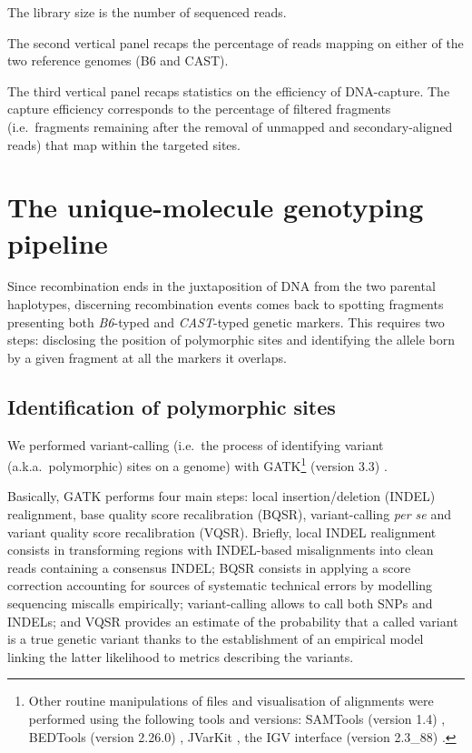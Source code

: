 \begin{sidewaystable}[p]
{		The library size is the number of sequenced reads.
		\par The second vertical panel recaps the percentage of reads mapping on either of the two reference genomes (B6 and CAST).
		\par The third vertical panel recaps statistics on the efficiency of DNA-capture.
		The capture efficiency corresponds to the percentage of filtered fragments (i.e.\ fragments remaining after the removal of unmapped and secondary-aligned reads) that map within the targeted sites.
	}
\label{tab:characteristics-seq-mapping-capture}
\end{sidewaystable}





\section{The unique-molecule genotyping pipeline}
\label{sec:pipeline}

Since recombination ends in the juxtaposition of DNA from the two parental haplotypes, discerning recombination events comes back to spotting fragments presenting both \textit{B6}-typed and \textit{CAST}-typed genetic markers.
This requires two steps: disclosing the position of polymorphic sites and identifying the allele born by a given fragment at all the markers it overlaps.


\subsection{Identification of polymorphic sites}

We performed variant-calling (i.e.\ the process of identifying variant (a.k.a.\ polymorphic) sites on a genome) with GATK\footnote{Other routine manipulations of files and visualisation of alignments were performed using the following tools and versions: SAMTools (version 1.4) \citep{li2009sequence}, BEDTools (version 2.26.0) \citep{quinlan2010bedtools}, JVarKit \citep{lindenbaum2015jvarkit}, the IGV interface (version 2.3\_88) \citep{robinson2011integrative}.} (version 3.3) \citep{mckenna2010genome}.

Basically, GATK performs four main steps: local insertion/deletion (INDEL) realignment, base quality score recalibration (BQSR), variant-calling \textit{per se} and variant quality score recalibration (VQSR).
Briefly, local INDEL realignment consists in transforming regions with INDEL-based misalignments into clean reads containing a consensus INDEL\@; BQSR consists in applying a score correction accounting for sources of systematic technical errors by modelling sequencing miscalls empirically; variant-calling allows to call both SNPs and INDELs; and VQSR provides an estimate of the probability that a called variant is a true genetic variant thanks to the establishment of an empirical model linking the latter likelihood to metrics describing the variants.\\


